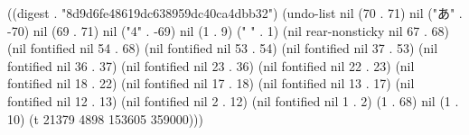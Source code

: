
((digest . "8d9d6fe48619dc638959dc40ca4dbb32") (undo-list nil (70 . 71) nil ("あ" . -70) nil (69 . 71) nil ("4" . -69) nil (1 . 9) (" " . 1) (nil rear-nonsticky nil 67 . 68) (nil fontified nil 54 . 68) (nil fontified nil 53 . 54) (nil fontified nil 37 . 53) (nil fontified nil 36 . 37) (nil fontified nil 23 . 36) (nil fontified nil 22 . 23) (nil fontified nil 18 . 22) (nil fontified nil 17 . 18) (nil fontified nil 13 . 17) (nil fontified nil 12 . 13) (nil fontified nil 2 . 12) (nil fontified nil 1 . 2) (1 . 68) nil (1 . 10) (t 21379 4898 153605 359000)))
